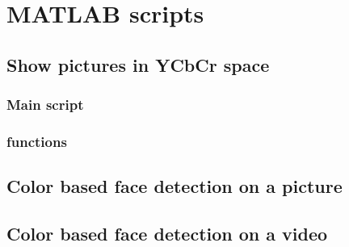 \documentclass[Bachelorarbeit.tex]{subfiles}
\begin{document}
\chapter{MATLAB scripts}

\section{Show pictures in YCbCr space}
\subsection{Main script}


\subsection{functions}


\bigskip
\section{Color based face detection on a picture}
\label{DetectionOnAPicture}


\bigskip
\section{Color based face detection on a video}
\label{DetectionOnAVideo}

\end{document}
